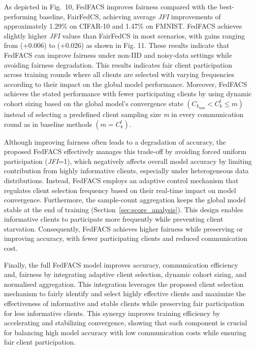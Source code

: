 \documentclass[pdflatex,sn-mathphys-num,oneside]{sn-jnl}%
\theoremstyle{thmstyleone}%
\theoremstyle{thmstyletwo}%
\theoremstyle{thmstylethree}%
\begin{document}
As depicted in Fig.~10, FedFACS improves fairness compared with the best-performing baseline, FairFedCS, achieving average \textit{JFI} improvements of approximately 1.29\% on CIFAR-10 and 1.47\% on FMNIST. FedFACS achieves slightly higher \textit{JFI} values than FairFedCS in most scenarios, with gains ranging from (+0.006) to (+0.026) as shown in Fig. 11. These results indicate that FedFACS can improve fairness under non-IID and noisy-data settings while avoiding fairness degradation. This results indicates fair client participation across training rounds where all clients are selected with varying frequencies according to their impact on the global model performance. Moreover, FedFACS achieves the stated performance with fewer participating clients by using dynamic cohort sizing based on the global model’s convergence state $(C_{k_{\min}} < C_k^t \le m)$ instead of selecting a predefined client sampling size \textit{m} in every communication round as in baseline methods $(m = C_k^t)$. 


Although improving fairness often leads to a degradation of accuracy, the proposed FedFACS effectively manages this trade-off by avoiding forced uniform participation (\textit{JFI}=1), which negatively affects overall model accuracy by limiting contribution from highly informative clients, especially under heterogeneous data distributions. Instead, FedFACS employs an adaptive control mechanism that regulates client selection frequency based on their real-time impact on model convergence. Furthermore, the sample-count aggregation keeps the global model stable at the end of training (Section~\ref{sec:score_analysis}). This design enables informative clients to participate more frequently while preventing client starvation. Consequently, FedFACS achieves higher fairness while preserving or improving accuracy, with fewer participating clients and reduced communication cost.


Finally, the full FedFACS model improves accuracy, communication efficiency and, fairness by integrating adaptive client selection, dynamic cohort sizing, and normalised aggregation. This integration leverages the proposed client selection mechanism to fairly identify and select highly effective clients and maximize the effectiveness of informative and stable clients while preserving fair participation for less informative clients. This synergy improves training efficiency by accelerating and stabilizing convergence, showing that each component is crucial for balancing high model accuracy with low communication costs while ensuring fair client participation.
\end{document}
